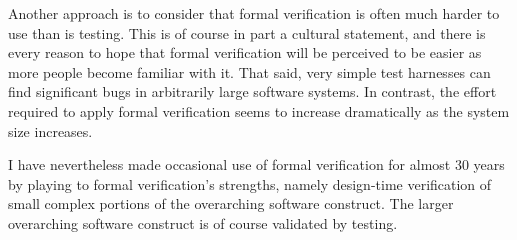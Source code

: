 \QuickQuizEnd

Another approach is to consider that
formal verification is often much harder to use than is testing.
This is of course in part a cultural statement, and there is every reason
to hope that formal verification will be perceived to be easier as more
people become familiar with it.
That said, very simple test harnesses can find significant bugs in arbitrarily
large software systems.
In contrast, the effort required to apply formal verification seems to
increase dramatically as the system size increases.

I have nevertheless made occasional use of formal verification
for almost 30 years by playing to formal verification's strengths,
namely design-time verification of small complex portions of the overarching
software construct.
The larger overarching software construct is of course validated by testing.

